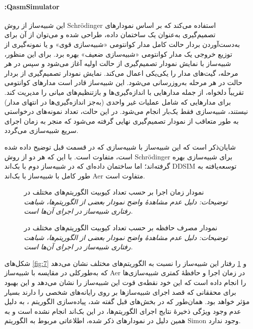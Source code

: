 \paragraph{:QasmSimulator}
این شبیه‌ساز از روش Schrödinger استفاده می‌کند که بر اساس نمودارهای تصمیم‌گیری به‌عنوان یک ساختمان داده، طراحی شده و می‌توان از آن برای به‌دست‌آوردن بردار حالت کامل مدار کوانتومی «شبیه‌سازی قوی» 
\cite{zulehner_advanced_2019}
و یا نمونه‌گیری از توزیع خروجی یک مدار کوانتومی «شبیه‌سازی ضعیف» 
\cite{hillmich_just_2020}
بهره برد. برای این منظور، شبیه‌ساز با نمایش نمودار تصمیم‌گیری از حالت اولیه آغاز می‌شود و سپس در هر مرحله، گیت‌های مدار را یکی‌یکی اعمال می‌کند. نمایش نمودار تصمیم‌گیری از بردار حالت در هر مرحله به‌روزرسانی می‌شود. این شبیه‌ساز قادر است مدارهای کوانتومی تقریباً دلخواه، از جمله مدارهایی با اندازه‌گیری‌ها و بازتنظیم‌های میانی را مدیریت کند. برای مدارهایی که شامل عملیات غیر واحدی (به‌جز اندازه‌گیری‌ها در انتهای مدار) نیستند، شبیه‌سازی فقط یک‌بار انجام می‌شود. در این حالت، تعداد نمونه‌های درخواستی به طور متعاقب از نمودار تصمیم‌گیری نهایی گرفته می‌شود که منجر به زمان اجرای سریع شبیه‌سازی می‌گردد.

شایان‌ذکر است که این شبیه‌ساز با شبیه‌سازی که در قسمت قبل توضیح داده شده است، متفاوت است. با این که هر دو از روش Schrödinger برای شبیه‌سازی بهره گرفته‌اند؛ اما ساختمان داده‌ای که در شبیه‌ساز دوم با بک‌اند DDSIM توسعه‌یافته به طور کامل با شبیه‌ساز با بک‌اند Aer متفاوت است.

\begin{figure}
	\centering
	\captionsetup{justification=centering}
	
	\caption[نمودار زمان اجرا ]{
		نمودار زمان اجرا بر حسب تعداد کیوبیت الگوریتم‌های مختلف در
		\newline \textit{
			توضیحات: دلیل عدم مشاهد‌هٔ واضح نمودار بعضی از الگوریتم‌ها، شباهت رفتاری شبیه‌ساز در اجرای آن‌ها است.
		}
		}
	\label{fig:7}
	\vspace{1cm}
	\captionsetup{justification=centering}
	
	\caption[نمودار مصرف حافظه ]{
		نمودار مصرف حافظه بر حسب تعداد کیوبیت الگوریتم‌های مختلف در
		\newline \textit{
			توضیحات: دلیل عدم مشاهد‌هٔ واضح نمودار بعضی از الگوریتم‌ها، شباهت رفتاری شبیه‌ساز در اجرای آن‌ها است.
		}
		}
	\label{fig:8}
\end{figure}

شکل‌های \ref{fig:7} و \ref{fig:8} رفتار این شبیه‌ساز را نسبت به الگوریتم‌های مختلف نشان می‌دهد که به‌طورکلی در مقایسه با شبیه‌ساز Aer در زمان اجرا و حافظهٔ کمتری شبیه‌سازی‌ها را انجام داده است که این خود نقطه‌ی قوت این شبیه‌ساز را نشان می‌دهد و این بهبود برای محققانی که قصد اجرای شبیه‌سازها بر روی رایانه‌های شخصی را دارند بسیار مؤثر خواهد بود. همان‌طور که در بخش‌های قبل گفته شد، پیاده‌سازی الگوریتم
،
به دلیل عدم وجود ویژگی ذخیرهٔ نتایج اجرای الگوریتم‌ها، در این بک‌اند انجام نشده است و به همین دلیل در نمودارهای ذکر شده، اطلاعاتی مربوط به الگوریتم Simon وجود ندارد.

